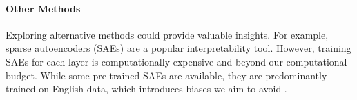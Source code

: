 \paragraph{Other Methods}
Exploring alternative methods could provide valuable insights. For example, sparse autoencoders (SAEs) \citep{olshausen1997sparse, hinton2006reducing, templeton2024scaling} are a popular interpretability tool. 
However, training SAEs for each layer is computationally expensive and beyond our computational budget. 
While some pre-trained SAEs are available, they are predominantly trained on English data, which introduces biases we aim to avoid \citep{lieberum2024gemmascopeopensparse}.
